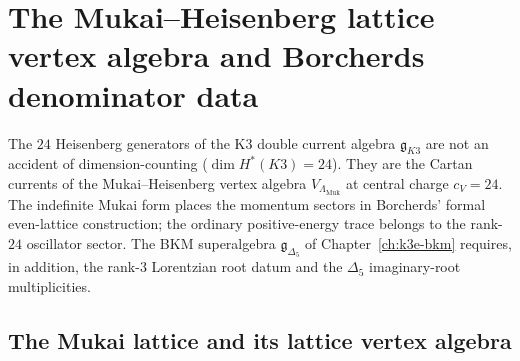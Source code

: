 \section{The Mukai--Heisenberg lattice vertex algebra and Borcherds denominator data}
\label{sec:k3-mukai-heisenberg-voa}

The $24$ Heisenberg generators of the K3 double current algebra
$\mathfrak{g}_{K3}$ are not an accident of dimension-counting
($\dim H^*(K3) = 24$). They are the Cartan currents of the
Mukai--Heisenberg vertex algebra $V_{\Lambda_{\mathrm{Muk}}}$ at
central charge $c_V = 24$. The indefinite Mukai form places the momentum
sectors in Borcherds' formal even-lattice construction; the ordinary
positive-energy trace belongs to the rank-$24$ oscillator sector. The BKM
superalgebra $\mathfrak{g}_{\Delta_5}$ of Chapter~\ref{ch:k3e-bkm}
requires, in addition, the rank-$3$ Lorentzian root datum and the
$\Delta_5$ imaginary-root multiplicities.

\subsection{The Mukai lattice and its lattice vertex algebra}
\label{subsec:k3-mukai-lattice-voa}

